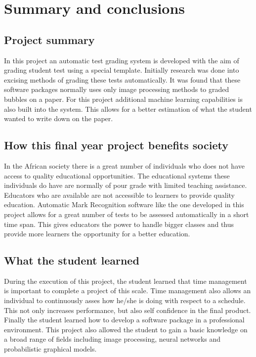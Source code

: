 \def\baselinestretch{1}
\chapter{Summary and conclusions}
\label{ch:Conclusions}

\graphicspath{{Conclusions/Figures_Conclusions/}}
\section{Project summary}

In this project an automatic test grading system is developed with the aim of grading student test using a special template. Initially research was done into excising methods of grading these tests automatically. It was found that these software packages normally uses only image processing methods to graded bubbles on a paper. For this project additional machine learning capabilities is also built into the system. This allows for a better estimation of what the student  wanted to write down on the paper.

\section{How this final year project benefits society}
In the African society there is a great number of individuals who does not have access to quality educational opportunities. The educational systems these individuals do have are normally of pour grade with limited teaching assistance. Educators who are available are not accessible to learners to provide quality education. Automatic Mark Recognition software like the one developed in this project allows for a great number of tests to be assessed automatically in a short time span. This gives educators the power to handle bigger classes and thus provide more learners the opportunity for a better education.

\section{What the student learned}
During the execution of this project, the student learned that time management is important to complete a project of this scale. Time management also allows an individual to continuously asses how he/she is doing with respect to a schedule. This not only increases performance, but also self confidence in the final product. Finally the student learned how to develop a software package in a professional environment. This project also allowed the student to gain a basic knowledge on a broad range of fields including image processing, neural networks and probabilistic graphical models. 


